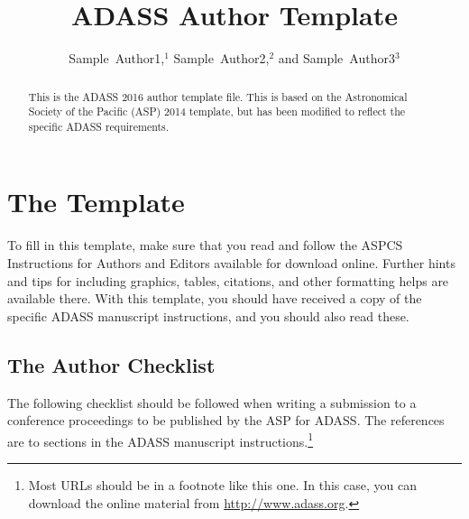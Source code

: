 \documentclass[11pt,twoside]{article}
\begin{document}
\title{ADASS Author Template}

\author{Sample~Author1,$^1$ Sample~Author2,$^2$ and Sample~Author3$^3$
}


\begin{abstract}
This is the ADASS 2016 author template file.  This is based on the Astronomical Society of the Pacific (ASP) 2014 template, but has been modified to reflect the specific ADASS requirements.
\end{abstract}

\section{The Template}
To fill in this template, make sure that you read and follow the ASPCS Instructions for Authors and Editors available for download online. Further hints and tips for including graphics, tables, citations, and other formatting helps are available there. With this template, you should have received a copy of the specific ADASS manuscript instructions, and you should also read these.

\subsection{The Author Checklist}
The following checklist should be followed when writing a submission to a conference proceedings to be published by the ASP for ADASS. The references are to sections in the ADASS manuscript instructions.\footnote{Most URLs should be in a footnote like this one.  In this case, you can download the online material from \url{http://www.adass.org}.} 
\end{document}
